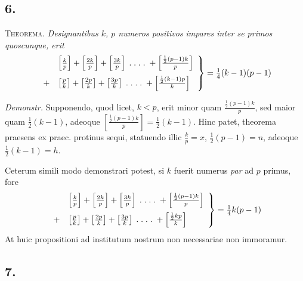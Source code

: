 \documentclass[14pt]{memoir}
\begin{document}
\subsection*{6.} 
\textsc{Theorema}. \textit{Designantibus \(k\), \(p\) numeros positivos impares inter se primos quoscunque, erit }
\[ \left. \begin{array}{rl}& \left[\frac{k}{p}\right] + \left[\frac{2k}{p}\right] + \left[\frac{3k}{p}\right] \;.\;.\;.\;.\; + \left[\frac{\frac{1}{2}(p-1)k}{p}\right] \vspace{2mm} \\
+& \left[\frac{p}{k}\right] + \left[\frac{2p}{k}\right] + \left[\frac{3p}{k}\right] \;.\;.\;.\;.\; + \left[\frac{\frac{1}{2}(k-1)p}{k}\right] \end{array} \right\} = \tfrac{1}{4}(k-1)(p-1) \]

\textit{Demonstr.} Supponendo, quod licet, \(k<p\), erit minor quam \(\tfrac{\frac{1}{2}(p-1)k}{p}\), 
sed maior quam \(\tfrac{1}{2}(k-1)\), adeoque \(\left[\tfrac{ \frac{1}{2}(p-1)k}{p}\right] = \tfrac{1}{2}(k-1)\). Hinc patet, theorema praesens ex praec. protinus sequi, statuendo illic \(\tfrac{k}{p}=x\), \(\tfrac{1}{2}(p-1)=n\), adeoque \(\tfrac{1}{2}(k-1) = h\). %


Ceterum simili modo demonstrari potest, si \(k\) fuerit numerus \textit{par} ad \(p\) primus, fore 
\[ \left. \begin{array}{rl} &\left[\frac{k}{p}\right] + \left[\frac{2k}{p}\right] + \left[\frac{3k}{p}\right] \;.\;.\;.\;.\; + \left[\frac{\frac{1}{2}(p-1)k}{p}\right]  \vspace{2mm}\\
+& \left[\frac{p}{k}\right] + \left[\frac{2p}{k}\right] + \left[\frac{3p}{k}\right] \;.\;.\;.\;.\; + \left[\frac{\frac{1}{2}kp}{k}\right] \end{array} \right\} = \tfrac{1}{4}k(p-1) \]
At huic propositioni ad institutum nostrum non necessariae non immoramur. 

\subsection*{7.}
\end{document}
